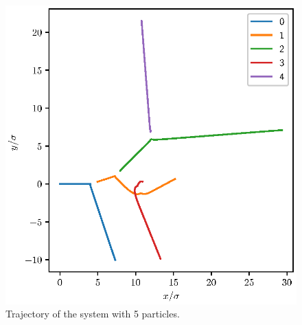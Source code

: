 \documentclass[a4paper,10pt,bibtotoc]{scrartcl}
\begin{document}
\begin{figure}[t]
 \includegraphics{Figure_trajectories_no_PBC.eps}
 \caption{Trajectory of the system with 5 particles.}
 \label{fig:fig3}
\end{figure}
\end{document}
